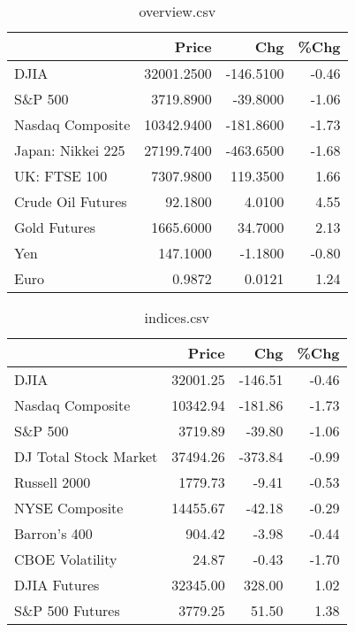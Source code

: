 \documentclass{article}%
\begin{document}
\begin{table}[htbp]%
\caption{overview.csv}%
\centering%
\begin{adjustbox}{width=1\textwidth}%
\begin{tabular}{lrrr}
\toprule
                  &      Price &       Chg &  \%Chg \\
\midrule
             DJIA & 32001.2500 & -146.5100 & -0.46 \\
          S\&P 500 &  3719.8900 &  -39.8000 & -1.06 \\
 Nasdaq Composite & 10342.9400 & -181.8600 & -1.73 \\
Japan: Nikkei 225 & 27199.7400 & -463.6500 & -1.68 \\
     UK: FTSE 100 &  7307.9800 &  119.3500 &  1.66 \\
Crude Oil Futures &    92.1800 &    4.0100 &  4.55 \\
     Gold Futures &  1665.6000 &   34.7000 &  2.13 \\
              Yen &   147.1000 &   -1.1800 & -0.80 \\
             Euro &     0.9872 &    0.0121 &  1.24 \\
\bottomrule
\end{tabular}
%
\end{adjustbox}%
\end{table}

%


\begin{table}[htbp]%
\caption{indices.csv}%
\centering%
\begin{adjustbox}{width=1\textwidth}%
\begin{tabular}{lrrr}
\toprule
                      &    Price &     Chg &  \%Chg \\
\midrule
                 DJIA & 32001.25 & -146.51 & -0.46 \\
     Nasdaq Composite & 10342.94 & -181.86 & -1.73 \\
              S\&P 500 &  3719.89 &  -39.80 & -1.06 \\
DJ Total Stock Market & 37494.26 & -373.84 & -0.99 \\
         Russell 2000 &  1779.73 &   -9.41 & -0.53 \\
       NYSE Composite & 14455.67 &  -42.18 & -0.29 \\
         Barron's 400 &   904.42 &   -3.98 & -0.44 \\
      CBOE Volatility &    24.87 &   -0.43 & -1.70 \\
         DJIA Futures & 32345.00 &  328.00 &  1.02 \\
      S\&P 500 Futures &  3779.25 &   51.50 &  1.38 \\
\bottomrule
\end{tabular}
%
\end{adjustbox}%
\end{table}
\end{document}

